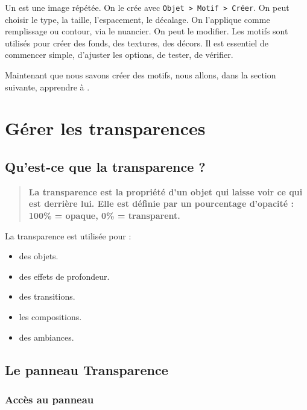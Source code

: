 Un  est une image répétée. On le crée avec \texttt{Objet > Motif > Créer}. On peut choisir le type, la taille, l'espacement, le décalage. On l'applique comme remplissage ou contour, via le nuancier. On peut le modifier. Les motifs sont utilisés pour créer des fonds, des textures, des décors. Il est essentiel de commencer simple, d'ajuster les options, de tester, de vérifier.

Maintenant que nous savons créer des motifs, nous allons, dans la section suivante, apprendre à .

\section{Gérer les transparences}

\subsection{Qu'est-ce que la transparence ?}

\begin{quote}
\textbf{La transparence est la propriété d'un objet qui laisse voir ce qui est derrière lui. Elle est définie par un pourcentage d'opacité : 100\% = opaque, 0\% = transparent.}
\end{quote}

La transparence est utilisée pour :

\begin{itemize}
    \item {} des objets.
    \item {} des effets de profondeur.
    \item {} des transitions.
    \item {} les compositions.
    \item {} des ambiances.
\end{itemize}

\subsection{Le panneau Transparence}

\subsubsection{Accès au panneau}

